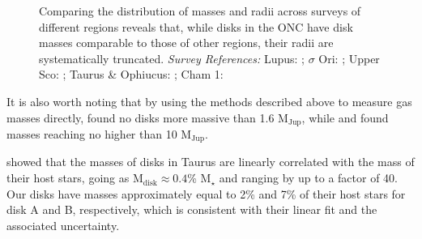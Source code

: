 


\begin{figure}[h!]
  \centering
    \hspace*{\fill}%
    \hspace*{\fill}%
    \caption{Comparing the distribution of masses and radii across surveys of different regions \citep{Eisner2018} reveals that, while disks in the ONC have disk masses comparable to those of other regions, their radii are systematically truncated. \textit{Survey References:} Lupus: \citet{Tazzari2017}; $\sigma$ Ori: \citet{Ansdell2017}; Upper Sco: \citet{Barenfeld2017}; Taurus \& Ophiucus: \citet{Tripathi2017}; Cham 1: \citet{Pascucci2016}}
    \label{fig:eisner18_disk_properties}
\end{figure}


It is also worth noting that by using the methods described above to measure gas masses directly, \citet{Miotello2017} found no disks more massive than 1.6 M$_\text{Jup}$, while \citet{Ansdell2016} and \citet{Ansdell2018} found masses reaching no higher than 10 M$_\text{Jup}$.

\citet{Andrews2013} showed that the masses of disks in Taurus are linearly correlated with the mass of their host stars, going as M$_\text{disk} \approx 0.4$\% M$_\star$ and ranging by up to a factor of 40. Our disks have masses approximately equal to 2\% and 7\% of their host stars for disk A and B, respectively, which is consistent with their linear fit and the associated uncertainty.

